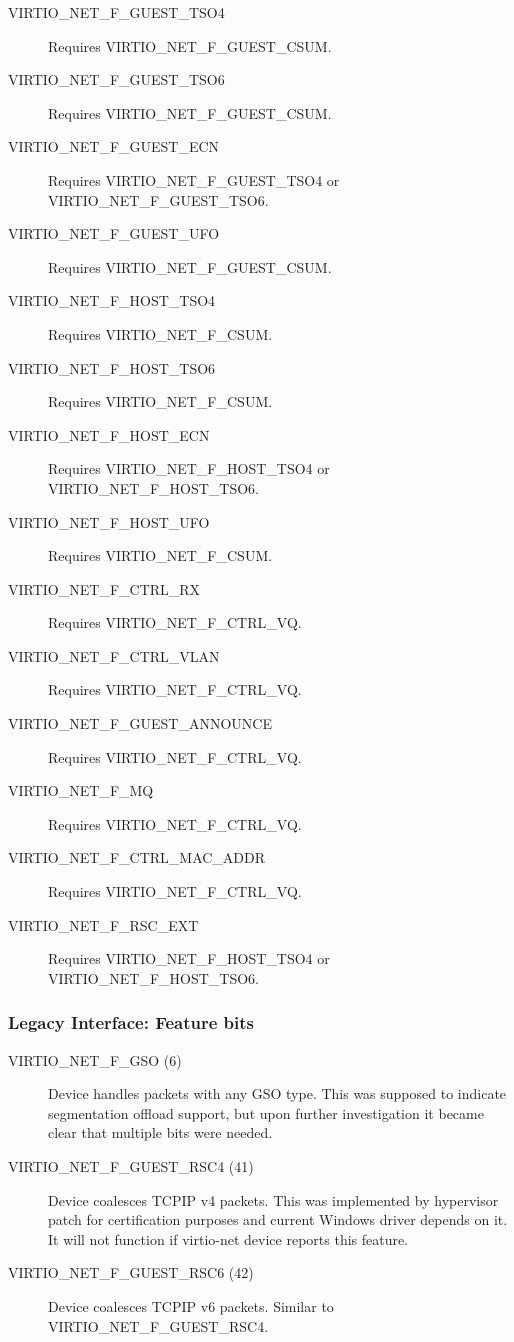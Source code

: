 \begin{description}
\item[VIRTIO_NET_F_GUEST_TSO4] Requires VIRTIO_NET_F_GUEST_CSUM.
\item[VIRTIO_NET_F_GUEST_TSO6] Requires VIRTIO_NET_F_GUEST_CSUM.
\item[VIRTIO_NET_F_GUEST_ECN] Requires VIRTIO_NET_F_GUEST_TSO4 or VIRTIO_NET_F_GUEST_TSO6.
\item[VIRTIO_NET_F_GUEST_UFO] Requires VIRTIO_NET_F_GUEST_CSUM.

\item[VIRTIO_NET_F_HOST_TSO4] Requires VIRTIO_NET_F_CSUM.
\item[VIRTIO_NET_F_HOST_TSO6] Requires VIRTIO_NET_F_CSUM.
\item[VIRTIO_NET_F_HOST_ECN] Requires VIRTIO_NET_F_HOST_TSO4 or VIRTIO_NET_F_HOST_TSO6.
\item[VIRTIO_NET_F_HOST_UFO] Requires VIRTIO_NET_F_CSUM.

\item[VIRTIO_NET_F_CTRL_RX] Requires VIRTIO_NET_F_CTRL_VQ.
\item[VIRTIO_NET_F_CTRL_VLAN] Requires VIRTIO_NET_F_CTRL_VQ.
\item[VIRTIO_NET_F_GUEST_ANNOUNCE] Requires VIRTIO_NET_F_CTRL_VQ.
\item[VIRTIO_NET_F_MQ] Requires VIRTIO_NET_F_CTRL_VQ.
\item[VIRTIO_NET_F_CTRL_MAC_ADDR] Requires VIRTIO_NET_F_CTRL_VQ.
\item[VIRTIO_NET_F_RSC_EXT] Requires VIRTIO_NET_F_HOST_TSO4 or VIRTIO_NET_F_HOST_TSO6.
\end{description}

\subsubsection{Legacy Interface: Feature bits}\label{sec:Device Types / Network Device / Feature bits / Legacy Interface: Feature bits}
\begin{description}
\item[VIRTIO_NET_F_GSO (6)] Device handles packets with any GSO type. This was supposed to indicate segmentation offload support, but
upon further investigation it became clear that multiple bits were needed.
\item[VIRTIO_NET_F_GUEST_RSC4 (41)] Device coalesces TCPIP v4 packets. This was implemented by hypervisor patch for certification
purposes and current Windows driver depends on it. It will not function if virtio-net device reports this feature.
\item[VIRTIO_NET_F_GUEST_RSC6 (42)] Device coalesces TCPIP v6 packets. Similar to VIRTIO_NET_F_GUEST_RSC4.
\end{description}


